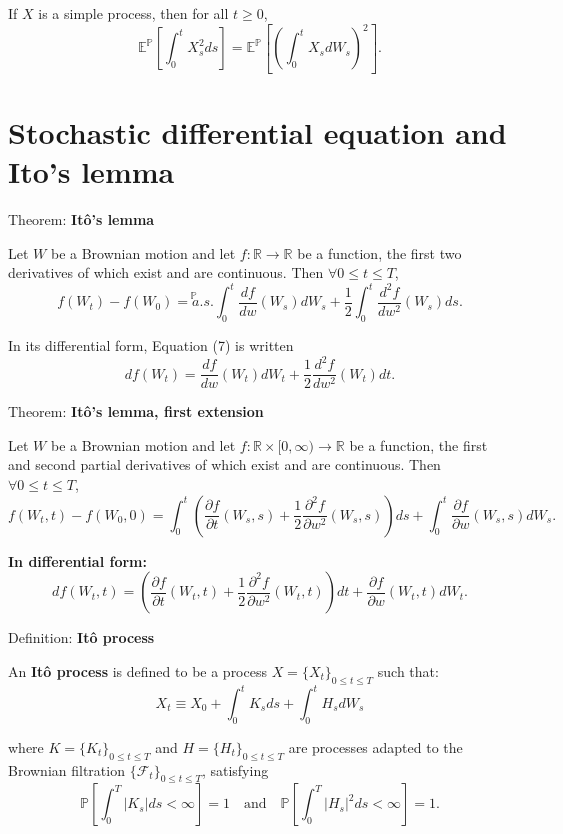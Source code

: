\documentclass[12pt,a4paper]{article}
\begin{document}
If $X$ is a simple process, then for all $t \geq 0$,
\[
\mathbb{E}^{\mathbb{P}}\left[\int_0^t X_s^2 ds\right] = \mathbb{E}^{\mathbb{P}}\left[\left(\int_0^t X_s dW_s\right)^2\right].
\]
\vspace{1em}


\section{Stochastic differential equation and Ito’s lemma}

Theorem: \textbf{Itô's lemma}
\vspace{0.5em}

Let $W$ be a Brownian motion and let $f : \mathbb{R} \to \mathbb{R}$ be a function, the first two derivatives of which exist and are continuous. Then $\forall 0 \leq t \leq T$,
\[
f(W_t) - f(W_0) \stackrel{\mathbb{P}}{=a.s.} \int_0^t \frac{df}{dw}(W_s) dW_s + \frac{1}{2} \int_0^t \frac{d^2f}{dw^2}(W_s) ds. \tag{7}
\]
\vspace{1em}

In its differential form, Equation (7) is written
\[
df(W_t) = \frac{df}{dw}(W_t) dW_t + \frac{1}{2} \frac{d^2f}{dw^2}(W_t) dt.
\]
\vspace{1em}

Theorem: \textbf{Itô's lemma, first extension}
\vspace{0.5em}

Let $W$ be a Brownian motion and let $f : \mathbb{R} \times [0, \infty) \to \mathbb{R}$ be a function, the first and second partial derivatives of which exist and are continuous. Then $\forall 0 \leq t \leq T$,
\[
f(W_t, t) - f(W_0, 0) = \int_0^t \left(\frac{\partial f}{\partial t}(W_s, s) + \frac{1}{2} \frac{\partial^2 f}{\partial w^2}(W_s, s)\right) ds + \int_0^t \frac{\partial f}{\partial w}(W_s, s) dW_s.
\]

\textbf{In differential form:}
\[
df(W_t, t) = \left(\frac{\partial f}{\partial t}(W_t, t) + \frac{1}{2} \frac{\partial^2 f}{\partial w^2}(W_t, t)\right) dt + \frac{\partial f}{\partial w}(W_t, t) dW_t.
\]
\vspace{1em}

Definition: \textbf{Itô process}
\vspace{0.5em}

An \textbf{Itô process} is defined to be a process $X = \{X_t\}_{0 \leq t \leq T}$ such that:
\[
X_t \equiv X_0 + \int_0^t K_s ds + \int_0^t H_s dW_s \tag{8}
\]

where $K = \{K_t\}_{0 \leq t \leq T}$ and $H = \{H_t\}_{0 \leq t \leq T}$ are processes adapted to the Brownian filtration $\{\mathcal{F}_t\}_{0 \leq t \leq T}$, satisfying
\[
\mathbb{P}\left[\int_0^T |K_s| ds < \infty\right] = 1 \quad \text{and} \quad \mathbb{P}\left[\int_0^T |H_s|^2 ds < \infty\right] = 1.
\]
\vspace{1em}
\end{document}
